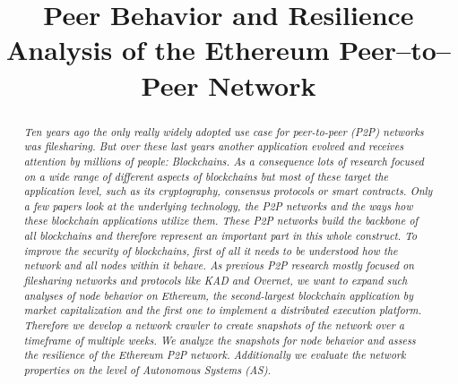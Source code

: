 \documentclass[10pt,conference,final]{IEEEtran}
\newcommand{\Hide}[1]{%
 { 
   \parindent0pt
   \emph{\scriptsize #1}
 }
}
\newcommand{\documenttitle}{Peer Behavior and Resilience Analysis of the Ethereum Peer--to--Peer Network}
\begin{document}
\title{\documenttitle}


\author{
}


\maketitle


\begin{abstract}

\Hide{
Ten years ago the only really widely adopted use case for peer-to-peer (P2P) networks was filesharing.
But over these last years another application evolved and receives attention by millions of people: Blockchains.
As a consequence lots of research focused on a wide range of different aspects of blockchains but most of these target the application level, such as its cryptography, consensus protocols or smart contracts.
Only a few papers look at the underlying technology, the P2P networks and the ways how these blockchain applications utilize them.
These P2P networks build the backbone of all blockchains and therefore represent an important part in this whole construct.
To improve the security of blockchains, first of all it needs to be understood how the network and all nodes within it behave.
As previous P2P research mostly focused on filesharing networks and protocols like KAD and Overnet, we want to expand such analyses of node behavior on Ethereum, the second-largest blockchain application by market capitalization and the first one to implement a distributed execution platform.
Therefore we develop a network crawler to create snapshots of the network over a timeframe of multiple weeks.
We analyze the snapshots for node behavior and assess the resilience of the Ethereum P2P network.
Additionally we evaluate the network properties on the level of Autonomous Systems (AS).
}
\end{abstract}
\vspace{2mm}
\end{document}
